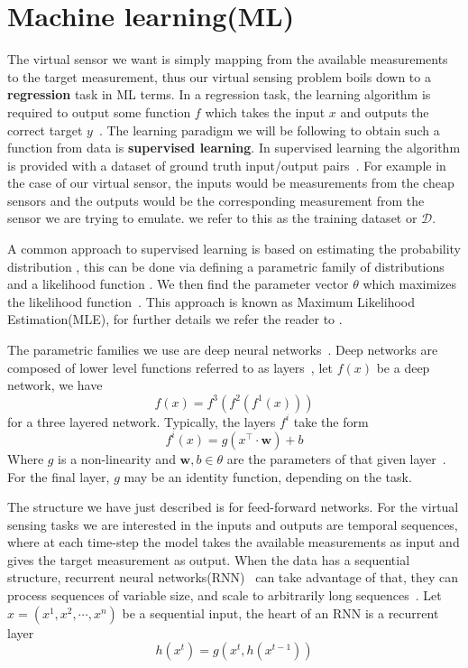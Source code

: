 \documentclass[../main.tex]{subfiles}
\begin{document}
\section{Machine learning(ML)}

The virtual sensor we want is simply mapping from the available measurements to the target measurement, thus our virtual sensing problem boils down to a \textbf{regression} task in ML terms. In a regression task, the learning algorithm is required to output some function $f$ which takes the input $x$ and outputs the correct target $y$~\citep[chapter~5]{goodfellow2016deep}. The learning paradigm we will be following to obtain such a function from data is \textbf{supervised learning}. In supervised learning the algorithm is provided with a dataset of ground truth input/output pairs~\citep[chapter~5]{goodfellow2016deep}. For example in the case of our virtual sensor, the inputs would be measurements from the cheap sensors and the outputs would be the corresponding measurement from the sensor we are trying to emulate. we refer to this as the training dataset or $\mathcal{D}$. 

A common approach to supervised learning is based on estimating the probability distribution , this can be done via defining a parametric family of distributions  and a likelihood function . We then find the parameter vector $\theta$ which maximizes the likelihood function~\citep[chapter~5]{goodfellow2016deep}. This approach is known as Maximum Likelihood Estimation(MLE), for further details we refer the reader to \cite[chapter~5]{goodfellow2016deep}. 

The parametric families we use are deep neural networks~\citep{goodfellow2016deep}. Deep networks are composed of lower level functions referred to as layers~\citep[chapter~6]{goodfellow2016deep}, let $f(x)$ be a deep network, we have  
$$
    f(x) = f^3(f^2(f^1(x)))
$$
for a three layered network. Typically, the layers $f^i$ take the form 
$$
    f^i(x) = g(x^\top \cdot \mathbf{w}) + b
$$
Where $g$ is a non-linearity and $\mathbf{w}, b \in \theta$ are the parameters of that given layer~\citep[chapter~6]{goodfellow2016deep}. For the final layer, $g$ may be an identity function, depending on the task.

The structure we have just described is for feed-forward networks.
For the virtual sensing tasks we are interested in the inputs and outputs are temporal sequences, where at each time-step the model takes the available measurements as input and gives the target measurement as output.
When the data has a sequential structure, recurrent neural networks(RNN)~\cite{rumelhart1986learning} can take advantage of that, they can process sequences of variable size, and scale to arbitrarily long sequences~\cite[chapter~10]{goodfellow2016deep}. Let $x=(x^1, x^2, \cdots, x^n)$ be a sequential input, the heart of an RNN is a recurrent layer
$$
    h(x^t) = g(x^t, h(x^{t-1}))
$$
\end{document}
